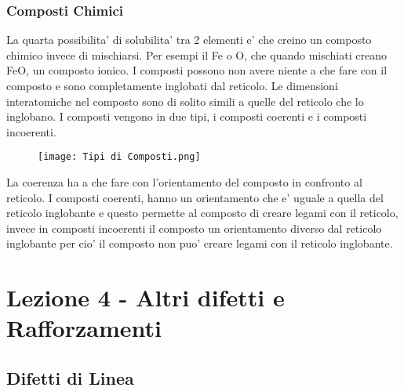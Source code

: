 \documentclass{article}
\begin{document}
        \subsubsection{Composti Chimici}
            La quarta possibilita' di solubilita' tra 2 elementi e' che creino un composto chimico invece di mischiarsi.
            Per esempi il Fe o O, che quando mischiati creano FeO, un composto ionico.
            I composti possono non avere niente a che fare con il composto e sono completamente inglobati dal reticolo. 
            Le dimensioni interatomiche nel composto sono di solito simili a quelle del reticolo che lo inglobano.
            \newline \newline I composti vengono in due tipi, i composti coerenti e i composti incoerenti.
            \begin{figure}
                \centering
                \texttt{[image: Tipi di Composti.png]}
            \end{figure}
            La coerenza ha a che fare con l'orientamento del composto in confronto al reticolo. I composti coerenti, hanno un orientamento che e' uguale a quella del 
            reticolo inglobante e questo permette al composto di creare legami con il reticolo, invece in composti incoerenti il composto un orientamento diverso dal 
            reticolo inglobante per cio' il composto non puo' creare legami con il reticolo inglobante.
    \section{Lezione 4 - Altri difetti e Rafforzamenti}
        \subsection{Difetti di Linea}
\end{document}
